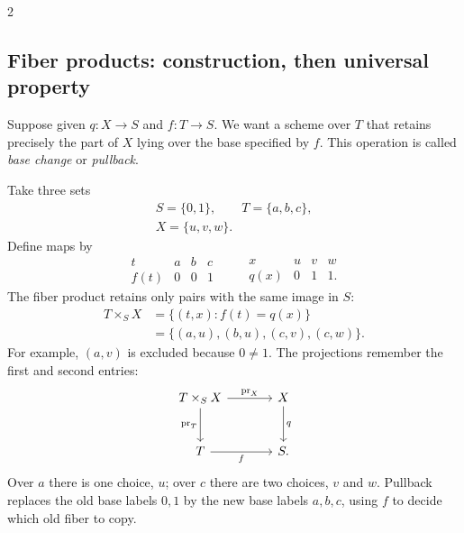 \documentclass[12pt]{memoir}
\begin{document}
\begin{multicols}{2}
\subsection{Fiber products: construction, then universal property}
Suppose given $q:X\to S$ and $f:T\to S$. We want a scheme over $T$
that retains precisely the part of $X$ lying over the base specified by
$f$. This operation is called \emph{base change} or \emph{pullback}.
\begin{Ex}\label{ex:finitefiber}
Take three sets
\[
\begin{gathered}
 S=\{0,1\},\qquad T=\{a,b,c\},\\
 X=\{u,v,w\}.
\end{gathered}
\]
Define maps by
\[
\begin{array}{c|ccc}
t&a&b&c\\\hline
f(t)&0&0&1
\end{array}
\qquad
\begin{array}{c|ccc}
x&u&v&w\\\hline
q(x)&0&1&1.
\end{array}
\]
The fiber product retains only pairs with the same image in $S$:
\[
\begin{aligned}
T\times_S X
 &=\{(t,x):f(t)=q(x)\}\\
 &=\{(a,u),(b,u),(c,v),(c,w)\}.
\end{aligned}
\]
For example, $(a,v)$ is excluded because $0\ne1$.
The projections remember the first and second entries:
\[
\begin{tikzcd}[column sep=large,row sep=large]
T\times_S X \arrow[r,"\pr_X"] \arrow[d,"\pr_T"']
 &X \arrow[d,"q"]\\
T \arrow[r,"f"'] &S.
\end{tikzcd}
\]
Over $a$ there is one choice, $u$; over $c$ there are two choices,
$v$ and $w$. Pullback replaces the old base labels $0,1$ by the new
base labels $a,b,c$, using $f$ to decide which old fiber to copy.
\end{Ex}


\end{multicols}
\end{document}
